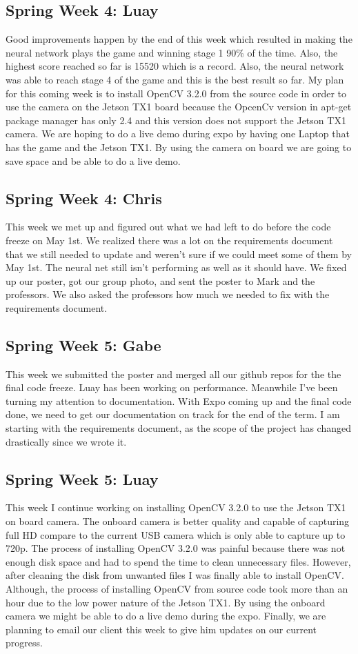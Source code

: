 \documentclass[onecolumn, draftclsnofoot,10pt, compsoc]{IEEEtran}
\begin{document}
\subsection{Spring Week 4: Luay}
Good improvements happen by the end of this week which resulted in making the neural network plays the game and winning stage 1 90\% of the time. Also, the highest score reached so far is 15520 which is a record. Also, the neural network was able to reach stage 4 of the game and this is the best result so far.
\newline\newline
My plan for this coming week is to install OpenCV 3.2.0 from the source code in order to use the camera on the Jetson TX1 board because the OpcenCv version in apt-get package manager has only 2.4 and this version does not support the Jetson TX1 camera. We are hoping to do a live demo during expo by having one Laptop that has the game and the Jetson TX1. By using the camera on board we are going to save space and be able to do a live demo.
\subsection{Spring Week 4: Chris}
This week we met up and figured out what we had left to do before the code freeze on May 1st. We realized there was a lot on the requirements document that we still needed to update and weren't sure if we could meet some of them by May 1st. The neural net still isn't performing as well as it should have. We fixed up our poster, got our group photo, and sent the poster to Mark and the professors. We also asked the professors how much we needed to fix with the requirements document.
\subsection{Spring Week 5: Gabe}
This week we submitted the poster and merged all our github repos for the the final code freeze. Luay has been working on performance. Meanwhile I've been turning my attention to documentation. With Expo coming up and the final code done, we need to get our documentation on track for the end of the term. I am starting with the requirements document, as the scope of the project has changed drastically since we wrote it.
\subsection{Spring Week 5: Luay}
This week I continue working on installing OpenCV 3.2.0 to use the Jetson TX1 on board camera. The onboard camera is better quality and capable of capturing full HD compare to the current USB camera which is only able to capture up to 720p. The process of installing OpenCV 3.2.0 was painful because there was not enough disk space and had to spend the time to clean unnecessary files. However, after cleaning the disk from unwanted files I was finally able to install OpenCV. Although, the process of installing OpenCV from source code took more than an hour due to the low power nature of the Jetson TX1. By using the onboard camera we might be able to do a live demo during the expo. Finally, we are planning to email our client this week to give him updates on our current progress.
\end{document}
